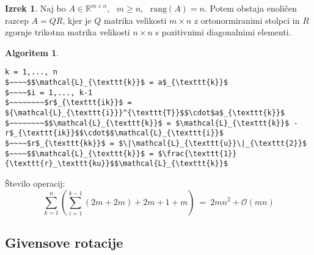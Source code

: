 \documentclass[11pt]{article}
\theoremstyle{definition}
\newtheorem{izrek}{Izrek}
\newtheorem*{algoritem}{Algoritem}
\begin{document}
\begin{izrek}

Naj bo $A \in \mathbb{R}^{m \times n}$, ~$m \geq n$, ~$\text{rang}(A) = n$. Potem obstaja enoličen razcep $A = QR$, kjer je $Q$ matrika velikosti $m \times n$ z ortonormiranimi stolpci in $R$ zgornje trikotna matrika velikosti $n \times n$ s pozitivnimi diagonalnimi elementi.

\end{izrek}
\vspace{0.5cm}

\begin{algoritem}
~
\begin{lstlisting}
k = 1,..., n
$~~~~$$\mathcal{L}_{\texttt{k}}$ = a$_{\texttt{k}}$
$~~~~$i = 1,..., k-1
$~~~~~~~~$r$_{\texttt{ik}}$ = ${\mathcal{L}_{\texttt{i}}}^{\texttt{T}}$$\cdot$a$_{\texttt{k}}$
$~~~~~~~~$$\mathcal{L}_{\texttt{k}}$ = $\mathcal{L}_{\texttt{k}}$ - r$_{\texttt{ik}}$$\cdot$$\mathcal{L}_{\texttt{i}}$ 
$~~~~$r$_{\texttt{kk}}$ = $\|\mathcal{L}_{\texttt{u}}\|_{\texttt{2}}$
$~~~~$$\mathcal{L}_{\texttt{k}}$ = $\frac{\texttt{1}}{\texttt{r}_\texttt{ku}}$$\mathcal{L}_{\texttt{k}}$
\end{lstlisting}
Število operacij:
$$\sum_{k=1}^n \left( \sum_{i=1}^{k-1} (2m + 2m) + 2m + 1 + m \right) ~=~ 2mn^2 + \mathcal{O}(mn)$$

\end{algoritem}
\vspace{0.5cm}


\subsection{Givensove rotacije}
\vspace{0.5cm}
\end{document}

